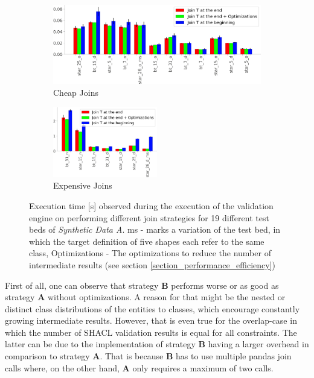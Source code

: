 \begin{figure}
        \centering
        \begin{subfigure}{\linewidth}
            \centering
            \includegraphics[width=\textwidth]{images/evaluation/validation_engine_join_small.png}
            \caption{Cheap Joins}
            \label{fig:scenario_test_join_small}
        \end{subfigure}
        \vspace{0.3cm}
        \begin{subfigure}{\linewidth}
            \centering
    \includegraphics[width=0.5\textwidth]{images/evaluation/validation_engine_join_large.png}
        \caption{Expensive Joins}            \label{fig:scenario_test_join_large}
        \end{subfigure} 
    \caption{Execution time [s] observed during the execution of the validation engine on performing different join strategies for 19 different test beds of \textit{Synthetic Data A}. ms - marks a variation of the test bed, in which the target definition of five shapes each refer to the same class, Optimizations - The optimizations to reduce the number of intermediate results (see section \ref{section_performance_efficiency})}
    \label{fig:scenario_test_join}
\end{figure}


First of all, one can observe that strategy \textbf{B} performs worse or as good as strategy \textbf{A} without optimizations. A reason for that might be the nested or distinct class distributions of the entities to classes, which encourage constantly growing intermediate results. However, that is even true for the \glqq overlap\grqq{}-case in which the number of SHACL validation results is equal for all constraints. The latter can be due to the implementation of strategy \textbf{B} having a larger overhead in comparison to strategy \textbf{A}. That is because \textbf{B} has to use multiple pandas join calls where, on the other hand, \textbf{A} only requires a maximum of two calls. 

